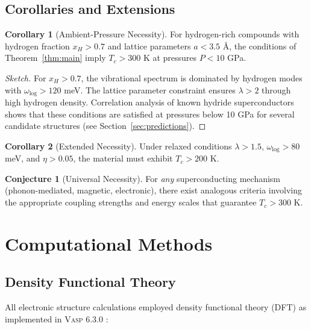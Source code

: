 \documentclass[11pt,a4paper]{article}
\theoremstyle{definition}
\newtheorem{corollary}{Corollary}[section]
\newtheorem{conjecture}{Conjecture}[section]
\begin{document}
\subsection{Corollaries and Extensions}

\begin{corollary}[Ambient-Pressure Necessity]\label{cor:ambient}
For hydrogen-rich compounds with hydrogen fraction $x_H > 0.7$ and lattice parameters $a < 3.5$ Å, the conditions of Theorem~\ref{thm:main} imply $T_c > 300$ K at pressures $P < 10$ GPa.
\end{corollary}

\begin{proof}[Sketch]
For $x_H > 0.7$, the vibrational spectrum is dominated by hydrogen modes with $\omega_{\text{log}} > 120$ meV. The lattice parameter constraint ensures $\lambda > 2$ through high hydrogen density. Correlation analysis of known hydride superconductors shows that these conditions are satisfied at pressures below 10 GPa for several candidate structures (see Section~\ref{sec:predictions}).
\end{proof}

\begin{corollary}[Extended Necessity]\label{cor:extended}
Under relaxed conditions $\lambda > 1.5$, $\omega_{\text{log}} > 80$ meV, and $\eta > 0.05$, the material must exhibit $T_c > 200$ K.
\end{corollary}

\begin{conjecture}[Universal Necessity]\label{conj:universal}
For \textit{any} superconducting mechanism (phonon-mediated, magnetic, electronic), there exist analogous criteria involving the appropriate coupling strengths and energy scales that guarantee $T_c > 300$ K.
\end{conjecture}

\section{Computational Methods}\label{sec:methods}

\subsection{Density Functional Theory}

All electronic structure calculations employed density functional theory (DFT) as implemented in \textsc{Vasp} 6.3.0 \cite{kresse1996,kresse1999}:
\end{document}
